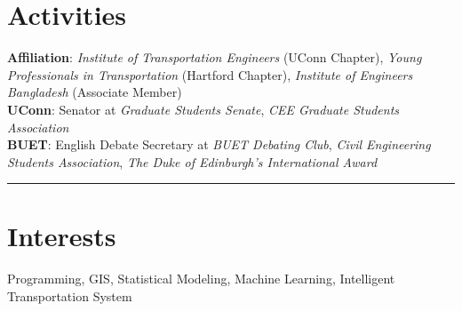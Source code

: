 \documentclass[margin]{res}%
\begin{document}
\begin{resume}
\section{Activities}
	{\bf Affiliation}:  \emph{Institute of Transportation Engineers} (UConn Chapter), \emph{Young Professionals in Transportation} (Hartford Chapter), \emph{Institute of Engineers Bangladesh} (Associate Member)\\
	{\bf UConn}: Senator at \emph{Graduate Students Senate}, \emph{CEE Graduate Students Association}\\
	{\bf BUET}: English Debate Secretary at \emph{BUET Debating Club}, \emph{Civil Engineering Students Association}, \emph{The Duke of Edinburgh's International Award}


\vspace{-1.9em}
\noindent\rule{\textwidth}{0.4pt}
\vspace{-1.85em}


\section{Interests}
	Programming, GIS, Statistical Modeling,  Machine Learning, Intelligent Transportation System

\end{resume}
\end{document}
